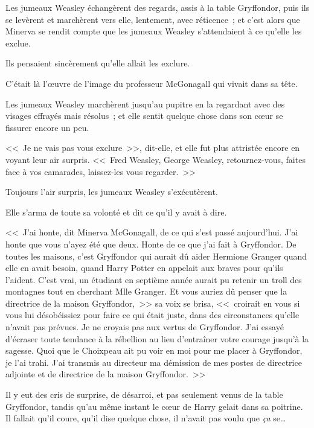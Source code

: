 Les jumeaux Weasley échangèrent des regards, assis à la table Gryffondor, puis ils se levèrent et marchèrent vers elle, lentement, avec réticence~; et c'est alors que Minerva se rendit compte que les jumeaux Weasley s'attendaient à ce qu'elle les exclue.

Ils pensaient sincèrement qu'elle allait les exclure.

C'était là l'œuvre de l'image du professeur McGonagall qui vivait dans sa tête.

Les jumeaux Weasley marchèrent jusqu'au pupitre en la regardant avec des visages effrayés mais résolus~; et elle sentit quelque chose dans son cœur se fissurer encore un peu.

<<~Je ne vais pas vous exclure~>>, dit-elle, et elle fut plus attristée encore en voyant leur air surpris. <<~Fred Weasley, George Weasley, retournez-vous, faites face à vos camarades, laissez-les vous regarder.~>>

Toujours l'air surpris, les jumeaux Weasley s'exécutèrent.

Elle s'arma de toute sa volonté et dit ce qu'il y avait à dire.

<<~J'ai honte, dit Minerva McGonagall, de ce qui s'est passé aujourd'hui. J'ai honte que vous n'ayez été que deux. Honte de ce que j'ai fait à Gryffondor. De toutes les maisons, c'est Gryffondor qui aurait dû aider Hermione Granger quand elle en avait besoin, quand Harry Potter en appelait aux braves pour qu'ils l'aident. C'est vrai, un étudiant en septième année aurait pu retenir un troll des montagnes tout en cherchant Mlle Granger. Et vous auriez dû penser que la directrice de la maison Gryffondor,~>> sa voix se brisa, <<~croirait en vous si vous lui désobéissiez pour faire ce qui était juste, dans des circonstances qu'elle n'avait pas prévues. Je ne croyais pas aux vertus de Gryffondor. J'ai essayé d'écraser toute tendance à la rébellion au lieu d'entraîner votre courage jusqu'à la sagesse. Quoi que le Choixpeau ait pu voir en moi pour me placer à Gryffondor, je l'ai trahi. J'ai transmis au directeur ma démission de mes postes de directrice adjointe et de directrice de la maison Gryffondor.~>>

\later

Il y eut des cris de surprise, de désarroi, et pas seulement venus de la table Gryffondor, tandis qu'au même instant le cœur de Harry gelait dans sa poitrine. Il fallait qu'il coure, qu'il dise quelque chose, il n'avait pas voulu que \emph{ça} se…

\later

